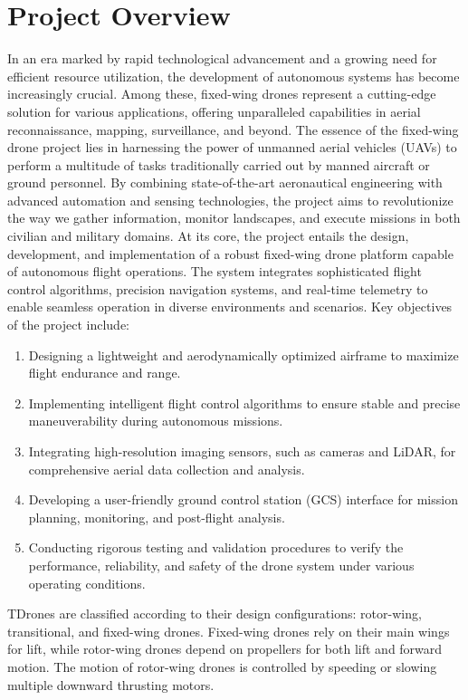 \documentclass[conference]{IEEEtran}
\begin{document}
\section{Project Overview}


In an era marked by rapid technological advancement and a growing need for efficient resource utilization, the development of autonomous systems has become increasingly crucial. Among these, fixed-wing drones represent a cutting-edge solution for various applications, offering unparalleled capabilities in aerial reconnaissance, mapping, surveillance, and beyond. The essence of the fixed-wing drone project lies in harnessing the power of unmanned aerial vehicles (UAVs) to perform a multitude of tasks traditionally carried out by manned aircraft or ground personnel\cite{grubesic2024overview}. By combining state-of-the-art aeronautical engineering with advanced automation and sensing technologies, the project aims to revolutionize the way we gather information, monitor landscapes, and execute missions in both civilian and military domains. At its core, the project entails the design, development, and implementation of a robust fixed-wing drone platform capable of autonomous flight operations. The system integrates sophisticated flight control algorithms, precision navigation systems, and real-time telemetry to enable seamless operation in diverse environments and scenarios. Key objectives of the project include:
\begin{enumerate}
    \item Designing a lightweight and aerodynamically optimized airframe to maximize flight endurance and range.
    \item Implementing intelligent flight control algorithms to ensure stable and precise maneuverability during autonomous missions.
    \item Integrating high-resolution imaging sensors, such as cameras and LiDAR, for comprehensive aerial data collection and analysis.
    \item Developing a user-friendly ground control station (GCS) interface for mission planning, monitoring, and post-flight analysis.
    \item Conducting rigorous testing and validation procedures to verify the performance, reliability, and safety of the drone system under various operating conditions.
    
\end{enumerate}
TDrones are classified according to their design configurations: rotor-wing, transitional, and fixed-wing drones\cite{HASSANALIAN201799}. Fixed-wing drones rely on their main wings for lift, while rotor-wing drones depend on propellers for both lift and forward motion. The motion of rotor-wing drones is controlled by speeding or slowing multiple downward thrusting motors.
\end{document}
